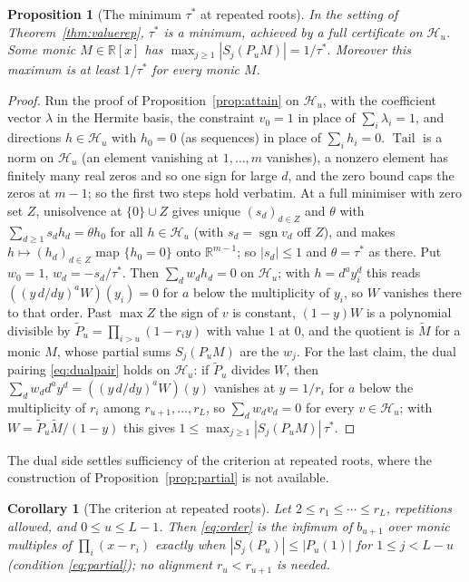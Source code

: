 \documentclass[11pt]{article}
\newtheorem{corollary}[theorem]{Corollary}
\newtheorem{proposition}[theorem]{Proposition}
\theoremstyle{definition}
\theoremstyle{plain}
\newcommand{\R}{\mathbb R}
\DeclareMathOperator{\Tail}{Tail}
\DeclareMathOperator{\sgn}{sgn}
\begin{document}
\begin{proposition}[The minimum $\tau^*$ at repeated roots]\label{prop:attainrep}
In the setting of Theorem~\ref{thm:valuerep}, $\tau^*$ is a minimum, achieved
by a full certificate on $\mathcal H_u$.  Some monic $M\in\R[x]$ has
$\max_{j\ge1}|S_j(P_uM)|=1/\tau^*$.  Moreover this maximum is at least
$1/\tau^*$ for every monic $M$.
\end{proposition}

\begin{proof}
Run the proof of Proposition~\ref{prop:attain} on $\mathcal H_u$, with the
coefficient vector $\lambda$ in the Hermite basis, the constraint $v_0=1$ in
place of $\sum_i\lambda_i=1$, and directions $h\in\mathcal H_u$ with $h_0=0$
(as sequences) in place of $\sum_ih_i=0$.  $\Tail$ is a
norm on $\mathcal H_u$ (an element vanishing at $1,\ldots,m$ vanishes), a
nonzero element has finitely many real zeros and so one sign for large $d$,
and the zero bound caps the zeros at $m-1$; so the first two steps hold
verbatim.  At a full minimiser with zero set $Z$, unisolvence at
$\{0\}\cup Z$ gives unique $(s_d)_{d\in Z}$ and $\theta$ with
$\sum_{d\ge1}s_dh_d=\theta h_0$ for all $h\in\mathcal H_u$ (with
$s_d=\sgn v_d$ off $Z$), and makes $h\mapsto(h_d)_{d\in Z}$ map
$\{h_0=0\}$ onto $\R^{m-1}$; so $|s_d|\le1$ and $\theta=\tau^*$ as there.
Put $w_0=1$, $w_d=-s_d/\tau^*$.  Then $\sum_dw_dh_d=0$ on $\mathcal H_u$;
with $h=d^ay_i^d$ this reads $((y\,d/dy)^aW)(y_i)=0$ for $a$ below the
multiplicity of $y_i$, so $W$ vanishes there to that order.  Past $\max Z$
the sign of $v$ is constant, $(1-y)W$ is a polynomial divisible by
$\widetilde P_u=\prod_{i>u}(1-r_iy)$ with value $1$ at $0$, and the quotient
is $\widetilde M$ for a monic $M$, whose partial sums $S_j(P_uM)$ are the
$w_j$.  For the last claim, the dual pairing \eqref{eq:dualpair} holds on
$\mathcal H_u$: if $\widetilde P_u$ divides $W$, then
$\sum_dw_dd^ay^d=((y\,d/dy)^aW)(y)$ vanishes at $y=1/r_i$ for $a$ below the
multiplicity of $r_i$ among $r_{u+1},\ldots,r_L$, so $\sum_dw_dv_d=0$ for
every $v\in\mathcal H_u$; with $W=\widetilde P_u\widetilde M/(1-y)$ this
gives $1\le\max_{j\ge1}|S_j(P_uM)|\,\tau^*$.
\end{proof}

The dual side settles sufficiency of the criterion at repeated roots, where
the construction of Proposition~\ref{prop:partial} is not available.

\begin{corollary}[The criterion at repeated roots]\label{cor:charrep}
Let $2\le r_1\le\cdots\le r_L$, repetitions allowed, and $0\le u\le L-1$.
Then \eqref{eq:order} is the infimum of $b_{u+1}$ over monic multiples of
$\prod_i(x-r_i)$ exactly when $|S_j(P_u)|\le|P_u(1)|$ for $1\le j<L-u$
(condition \eqref{eq:partial}); no alignment
$r_u<r_{u+1}$ is needed.
\end{corollary}
\end{document}
